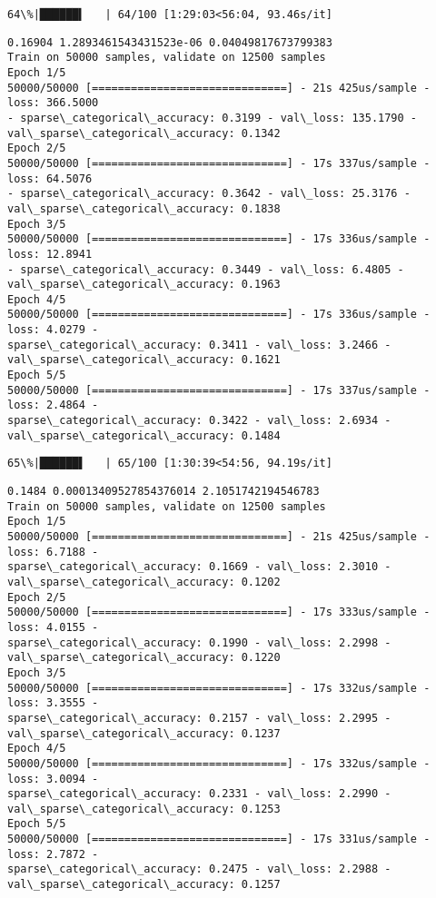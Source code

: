 \documentclass[11pt]{article}
\begin{document}
    \begin{Verbatim}[commandchars=\\\{\}]
 64\%|██████▍   | 64/100 [1:29:03<56:04, 93.46s/it]
    \end{Verbatim}

    \begin{Verbatim}[commandchars=\\\{\}]
0.16904 1.2893461543431523e-06 0.04049817673799383
Train on 50000 samples, validate on 12500 samples
Epoch 1/5
50000/50000 [==============================] - 21s 425us/sample - loss: 366.5000
- sparse\_categorical\_accuracy: 0.3199 - val\_loss: 135.1790 -
val\_sparse\_categorical\_accuracy: 0.1342
Epoch 2/5
50000/50000 [==============================] - 17s 337us/sample - loss: 64.5076
- sparse\_categorical\_accuracy: 0.3642 - val\_loss: 25.3176 -
val\_sparse\_categorical\_accuracy: 0.1838
Epoch 3/5
50000/50000 [==============================] - 17s 336us/sample - loss: 12.8941
- sparse\_categorical\_accuracy: 0.3449 - val\_loss: 6.4805 -
val\_sparse\_categorical\_accuracy: 0.1963
Epoch 4/5
50000/50000 [==============================] - 17s 336us/sample - loss: 4.0279 -
sparse\_categorical\_accuracy: 0.3411 - val\_loss: 3.2466 -
val\_sparse\_categorical\_accuracy: 0.1621
Epoch 5/5
50000/50000 [==============================] - 17s 337us/sample - loss: 2.4864 -
sparse\_categorical\_accuracy: 0.3422 - val\_loss: 2.6934 -
val\_sparse\_categorical\_accuracy: 0.1484
    \end{Verbatim}

    \begin{Verbatim}[commandchars=\\\{\}]
 65\%|██████▌   | 65/100 [1:30:39<54:56, 94.19s/it]
    \end{Verbatim}

    \begin{Verbatim}[commandchars=\\\{\}]
0.1484 0.00013409527854376014 2.1051742194546783
Train on 50000 samples, validate on 12500 samples
Epoch 1/5
50000/50000 [==============================] - 21s 425us/sample - loss: 6.7188 -
sparse\_categorical\_accuracy: 0.1669 - val\_loss: 2.3010 -
val\_sparse\_categorical\_accuracy: 0.1202
Epoch 2/5
50000/50000 [==============================] - 17s 333us/sample - loss: 4.0155 -
sparse\_categorical\_accuracy: 0.1990 - val\_loss: 2.2998 -
val\_sparse\_categorical\_accuracy: 0.1220
Epoch 3/5
50000/50000 [==============================] - 17s 332us/sample - loss: 3.3555 -
sparse\_categorical\_accuracy: 0.2157 - val\_loss: 2.2995 -
val\_sparse\_categorical\_accuracy: 0.1237
Epoch 4/5
50000/50000 [==============================] - 17s 332us/sample - loss: 3.0094 -
sparse\_categorical\_accuracy: 0.2331 - val\_loss: 2.2990 -
val\_sparse\_categorical\_accuracy: 0.1253
Epoch 5/5
50000/50000 [==============================] - 17s 331us/sample - loss: 2.7872 -
sparse\_categorical\_accuracy: 0.2475 - val\_loss: 2.2988 -
val\_sparse\_categorical\_accuracy: 0.1257
    \end{Verbatim}
\end{document}
